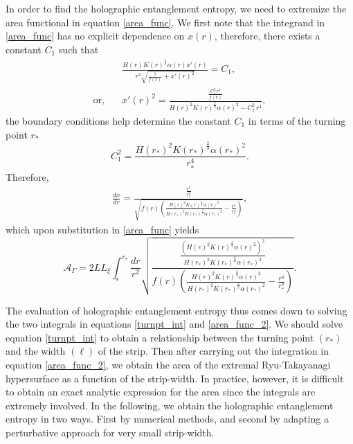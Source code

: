 \documentclass[12pt,a4paper]{article}
\numberwithin{equation}{section}
\begin{document}
In order to find the holographic entanglement entropy, we need to extremize the area functional in equation \eqref{area_func}. We first note that the integrand in \eqref{area_func} has no explicit dependence on $x(r)$, therefore, there exists a constant $C_1$ such that
%
\begin{align}
	& \frac{H(r) K(r)^{\frac{1}{3}} \alpha(r) x'(r)}{r^2 \sqrt{\frac{1}{f(r)} + x'(r)^2}} = C_1, \nonumber \\
	\text{or,}\quad & x'(r)^2 = \frac{\frac{C_1^2\,r^4}{f(r)}}{H(r)^2 K(r)^{\frac{2}{3}} \alpha(r)^2 - C_1^2\,r^4},
\end{align}
%
the boundary conditions help determine the constant $C_1$ in terms of the turning point $r_{\ast}$
%
\begin{equation}
	C_1^2 = \frac{H\left(r_*\right)^2 K\left(r_{\ast}\right)^{\frac{2}{3}} \alpha\left(r_{\ast}\right)^2}{r_{\ast}^4}.
\end{equation}
%
Therefore,
%
\begin{align}
	\frac{dx}{dr} = \frac{\frac{r^2}{r_{\ast}^2}}{\sqrt{ f(r) \left( \frac{H\left(r\right)^2 K\left(r\right)^{\frac{2}{3}} \alpha\left(r\right)^2}{H\left(r_*\right)^2 K\left(r_{\ast}\right)^{\frac{2}{3}} \alpha\left(r_{\ast}\right)^2} - \frac{r^4}{r_*^4} \right)} }, \label{turnpt_int}
\end{align}
%
which upon substitution in \eqref{area_func} yields
%
\begin{equation} \label{area_func_2}
    \mathcal{A}_{\Gamma} = 2 L L_{\xi} \int_{\epsilon}^{r_*} \frac{dr}{r^2} \sqrt{\frac{\frac{ \left( H\left(r\right)^2 K\left(r\right)^{\frac{2}{3}} \alpha\left(r\right)^2 \right)^2}{H\left(r_*\right)^2 K\left(r_{\ast}\right)^{\frac{2}{3}} \alpha\left(r_{\ast}\right)^2}}{f(r) \left( \frac{H\left(r\right)^2 K\left(r\right)^{\frac{2}{3}} \alpha\left(r\right)^2}{H\left(r_*\right)^2 K\left(r_{\ast}\right)^{\frac{2}{3}} \alpha\left(r_{\ast}\right)^2} - \frac{r^4}{r_*^4} \right)}}. 
\end{equation}

The evaluation of holographic entanglement entropy thus comes down to solving the two integrals in equations \eqref{turnpt_int} and \eqref{area_func_2}. We should solve equation \eqref{turnpt_int} to obtain a relationship between the turning point $\left(r_*\right)$ and the width $\left(\ell\right)$ of the strip. Then after carrying out the integration in equation \eqref{area_func_2}, we obtain the area of the extremal Ryu-Takayanagi hypersurface as a function of the strip-width. In practice, however, it is difficult to obtain an exact analytic expression for the area since the integrals are extremely involved. In the following, we obtain the holographic entanglement entropy in two ways. First by numerical methods, and second by adapting a perturbative approach for very small strip-width.
\end{document}
